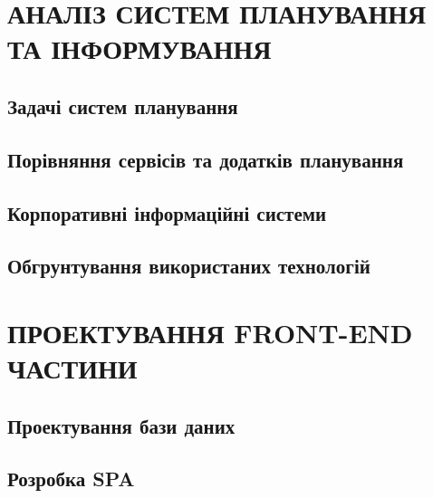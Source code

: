 \documentclass[a4paper,14pt]{extarticle} %
\begin{document}


\tableofcontents %
\clearpage


\section{АНАЛІЗ СИСТЕМ ПЛАНУВАННЯ ТА ІНФОРМУВАННЯ}

\subsection{Задачі систем планування} 

\subsection{Порівняння сервісів та додатків планування} 





\subsection{Корпоративні інформаційні системи} 



\subsection{Обгрунтування використаних технологій} 





\section{ПРОЕКТУВАННЯ FRONT-END ЧАСТИНИ}

\subsection{Проектування бази даних}






\subsection{Розробка SPA}


\end{document}
